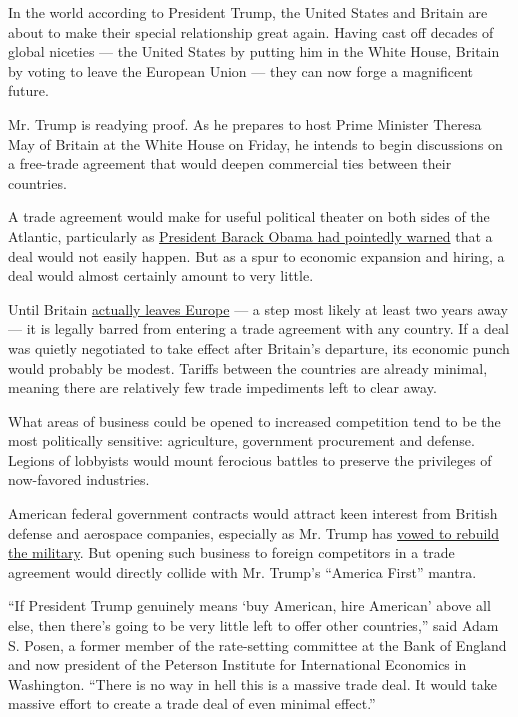In the world according to President Trump, the United States and Britain
are about to make their special relationship great again. Having cast
off decades of global niceties --- the United States by putting him in
the White House, Britain by voting to leave the European Union --- they
can now forge a magnificent future.

Mr. Trump is readying proof. As he prepares to host Prime Minister
Theresa May of Britain at the White House on Friday, he intends to begin
discussions on a free-trade agreement that would deepen commercial ties
between their countries.

A trade agreement would make for useful political theater on both sides
of the Atlantic, particularly as
\href{https://www.nytimes3xbfgragh.onion/2016/04/23/world/europe/obama-britain-visit.html}{President
Barack Obama had pointedly warned} that a deal would not easily happen.
But as a spur to economic expansion and hiring, a deal would almost
certainly amount to very little.

Until Britain
\href{https://www.nytimes3xbfgragh.onion/2017/01/24/world/europe/theresa-may-brexit-vote-article-50.html}{actually
leaves Europe} --- a step most likely at least two years away --- it is
legally barred from entering a trade agreement with any country. If a
deal was quietly negotiated to take effect after Britain's departure,
its economic punch would probably be modest. Tariffs between the
countries are already minimal, meaning there are relatively few trade
impediments left to clear away.

What areas of business could be opened to increased competition tend to
be the most politically sensitive: agriculture, government procurement
and defense. Legions of lobbyists would mount ferocious battles to
preserve the privileges of now-favored industries.

American federal government contracts would attract keen interest from
British defense and aerospace companies, especially as Mr. Trump has
\href{https://www.nytimes3xbfgragh.onion/2016/09/08/us/politics/donald-trump-speech.html}{vowed
to rebuild the military}. But opening such business to foreign
competitors in a trade agreement would directly collide with Mr. Trump's
``America First'' mantra.

``If President Trump genuinely means `buy American, hire American' above
all else, then there's going to be very little left to offer other
countries,'' said Adam S. Posen, a former member of the rate-setting
committee at the Bank of England and now president of the Peterson
Institute for International Economics in Washington. ``There is no way
in hell this is a massive trade deal. It would take massive effort to
create a trade deal of even minimal effect.''

